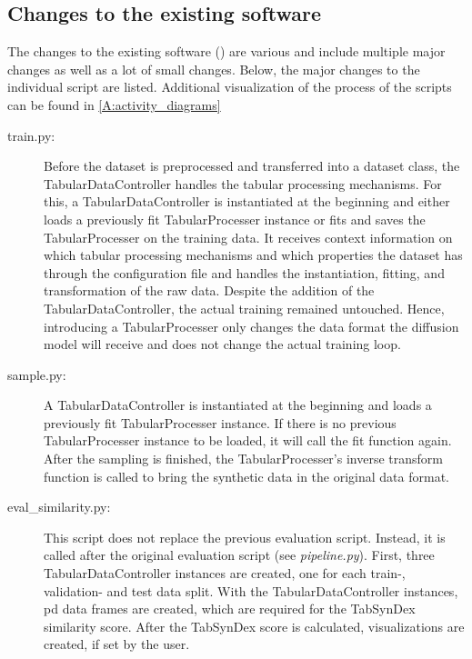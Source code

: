 \subsection{Changes to the existing software}
\label{ch:methods-changes}
The changes to the existing software () are various and include multiple major changes as well as a lot of small changes.
Below, the major changes to the individual script are listed.
Additional visualization of the process of the scripts can be found in \autoref{A:activity_diagrams}

\begin{description}
	\item[train.py:]
		Before the dataset is preprocessed and transferred into a dataset class, the TabularDataController handles the tabular processing mechanisms.
		For this, a TabularDataController is instantiated at the beginning and either loads a previously fit TabularProcesser instance or fits and saves the TabularProcesser on the training data.
		It receives context information on which tabular processing mechanisms and which properties the dataset has through the configuration file and handles the
		instantiation, fitting, and transformation of the raw data.
		Despite the addition of the TabularDataController, the actual training remained untouched.
		Hence, introducing a TabularProcesser only changes the data format the diffusion model will receive and does not change the actual training loop.

	\item[sample.py:]
		A TabularDataController is instantiated at the beginning and loads a previously fit TabularProcesser instance.
		If there is no previous TabularProcesser instance to be loaded, it will call the fit function again.
		After the sampling is finished, the TabularProcesser's inverse transform function is called to bring the synthetic data in the original data format.

	\item[eval\_similarity.py:]
		This script does not replace the previous evaluation script.
		Instead, it is called after the original evaluation script (see \textit{pipeline.py}).
		First, three TabularDataController instances are created, one for each train-, validation- and test data split.
		With the TabularDataController instances, \gls{pd} \cite{mckinney-proc-scipy-2010} data frames are created, which are required for the TabSynDex similarity score.
		After the TabSynDex score is calculated, visualizations are created, if set by the user.


\end{description}
